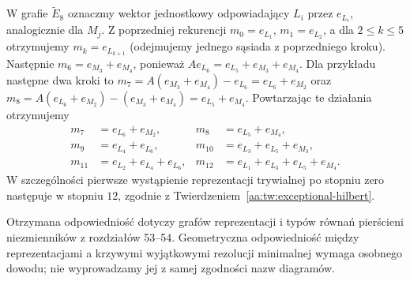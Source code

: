 \begin{przyklad}
W grafie $\widetilde E_8$ oznaczmy wektor jednostkowy
odpowiadający $L_i$ przez $e_{L_i}$, analogicznie
dla $M_j$. Z poprzedniej rekurencji
$m_0=e_{L_1}$, $m_1=e_{L_2}$, a dla $2\le k\le5$
otrzymujemy $m_k=e_{L_{k+1}}$ (odejmujemy jednego
sąsiada z poprzedniego kroku).
Następnie $m_6=e_{M_3}+e_{M_4}$, ponieważ
$Ae_{L_6}=e_{L_5}+e_{M_3}+e_{M_4}$.
Dla przykładu następne dwa kroki to
$m_7=A(e_{M_3}+e_{M_4})-e_{L_6}
=e_{L_6}+e_{M_2}$ oraz
$m_8=A(e_{L_6}+e_{M_2})-(e_{M_3}+e_{M_4})
=e_{L_5}+e_{M_4}$.
Powtarzając te działania otrzymujemy
\[
\begin{aligned}
 m_7&=e_{L_6}+e_{M_2},&
 m_8&=e_{L_5}+e_{M_4},\\
 m_9&=e_{L_4}+e_{L_6},&
 m_{10}&=e_{L_3}+e_{L_5}+e_{M_3},\\
 m_{11}&=e_{L_2}+e_{L_4}+e_{L_6},&
 m_{12}&=e_{L_1}+e_{L_3}+e_{L_5}+e_{M_4}.
\end{aligned}
\]
W szczególności pierwsze wystąpienie reprezentacji
trywialnej po stopniu zero następuje w stopniu $12$,
zgodnie z Twierdzeniem~\ref{aa:tw:exceptional-hilbert}.
\end{przyklad}

Otrzymana odpowiedniość dotyczy grafów reprezentacji
i typów równań pierścieni niezmienników z rozdziałów 53--54.
Geometryczna odpowiedniość między reprezentacjami
a krzywymi wyjątkowymi rezolucji minimalnej wymaga
osobnego dowodu; nie wyprowadzamy jej z samej
zgodności nazw diagramów.
